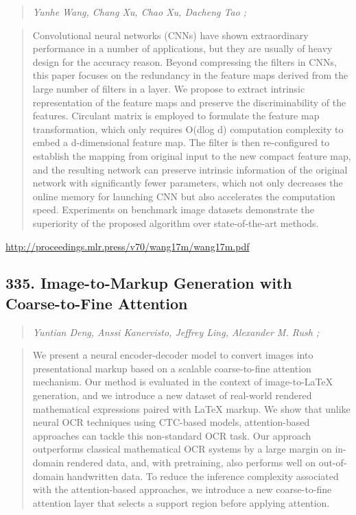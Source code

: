 \documentclass{article}
\begin{document}
\begin{quote}
\footnotesize{\textit{Yunhe Wang, Chang Xu, Chao Xu, Dacheng Tao ;}}

\end{quote}

\begin{quote}
    Convolutional neural networks (CNNs) have shown extraordinary performance in a number of applications, but they are usually of heavy design for the accuracy reason. Beyond compressing the filters in CNNs, this paper focuses on the redundancy in the feature maps derived from the large number of filters in a layer. We propose to extract intrinsic representation of the feature maps and preserve the discriminability of the features. Circulant matrix is employed to formulate the feature map transformation, which only requires O(dlog d) computation complexity to embed a d-dimensional feature map. The filter is then re-configured to establish the mapping from original input to the new compact feature map, and the resulting network can preserve intrinsic information of the original network with significantly fewer parameters, which not only decreases the online memory for launching CNN but also accelerates the computation speed. Experiments on benchmark image datasets demonstrate the superiority of the proposed algorithm over state-of-the-art methods.  
\end{quote}

\href{http://proceedings.mlr.press/v70/wang17m/wang17m.pdf}{http://proceedings.mlr.press/v70/wang17m/wang17m.pdf}

\subsection{335. Image-to-Markup Generation with Coarse-to-Fine Attention}

\begin{quote}
\footnotesize{\textit{Yuntian Deng, Anssi Kanervisto, Jeffrey Ling, Alexander M. Rush ;}}

\end{quote}

\begin{quote}
    We present a neural encoder-decoder model to convert images into presentational markup based on a scalable coarse-to-fine attention mechanism. Our method is evaluated in the context of image-to-LaTeX generation, and we introduce a new dataset of real-world rendered mathematical expressions paired with LaTeX markup. We show that unlike neural OCR techniques using CTC-based models, attention-based approaches can tackle this non-standard OCR task. Our approach outperforms classical mathematical OCR systems by a large margin on in-domain rendered data, and, with pretraining, also performs well on out-of-domain handwritten data. To reduce the inference complexity associated with the attention-based approaches, we introduce a new coarse-to-fine attention layer that selects a support region before applying attention.  
\end{quote}
\end{document}
